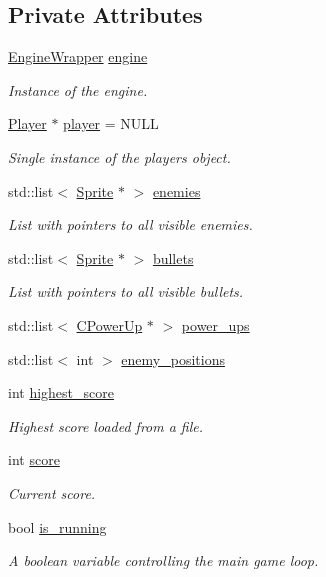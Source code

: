 \subsection*{Private Attributes}
\begin{DoxyCompactItemize}
\item 
\hyperlink{classEngineWrapper}{Engine\+Wrapper} \hyperlink{classGeus_a8b87135ab61453d81b02b97d73033c92}{engine}
\begin{DoxyCompactList}\small\item\em Instance of the engine. \end{DoxyCompactList}\item 
\hyperlink{classPlayer}{Player} $\ast$ \hyperlink{classGeus_a19106a3619fcb55de45bc8adac57496a}{player} = N\+U\+LL
\begin{DoxyCompactList}\small\item\em Single instance of the player\textquotesingle{}s object. \end{DoxyCompactList}\item 
std\+::list$<$ \hyperlink{classSprite}{Sprite} $\ast$ $>$ \hyperlink{classGeus_a182b15c0dcf2def10eb8f084b4e6ce4f}{enemies}
\begin{DoxyCompactList}\small\item\em List with pointers to all visible enemies. \end{DoxyCompactList}\item 
std\+::list$<$ \hyperlink{classSprite}{Sprite} $\ast$ $>$ \hyperlink{classGeus_a48aec553db9de3be3f1cbf0a8d14a1c8}{bullets}
\begin{DoxyCompactList}\small\item\em List with pointers to all visible bullets. \end{DoxyCompactList}\item 
std\+::list$<$ \hyperlink{classCPowerUp}{C\+Power\+Up} $\ast$ $>$ \hyperlink{classGeus_a797d5c7822b9b1e1eb6c46fca93551a3}{power\+\_\+ups}
\item 
std\+::list$<$ int $>$ \hyperlink{classGeus_a2ecbe7a824604651a704e0fff0a5c839}{enemy\+\_\+positions}
\item 
int \hyperlink{classGeus_a8b9366af73b19d4c2383b42e8c5cae7f}{highest\+\_\+score}
\begin{DoxyCompactList}\small\item\em Highest score loaded from a file. \end{DoxyCompactList}\item 
int \hyperlink{classGeus_a2ad271a665a5442697299b756cfee290}{score}
\begin{DoxyCompactList}\small\item\em Current score. \end{DoxyCompactList}\item 
bool \hyperlink{classGeus_aeb4cc6648c47d83e07340b39c85b62b3}{is\+\_\+running}
\begin{DoxyCompactList}\small\item\em A boolean variable controlling the main game loop. \end{DoxyCompactList}\end{DoxyCompactItemize}


